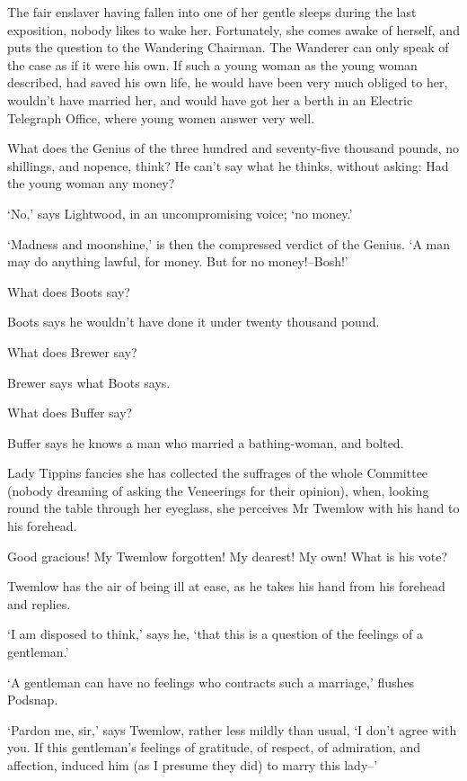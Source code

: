 The fair enslaver having fallen into one of her gentle sleeps during the
last exposition, nobody likes to wake her. Fortunately, she comes
awake of herself, and puts the question to the Wandering Chairman. The
Wanderer can only speak of the case as if it were his own. If such a
young woman as the young woman described, had saved his own life, he
would have been very much obliged to her, wouldn’t have married her, and
would have got her a berth in an Electric Telegraph Office, where young
women answer very well.

What does the Genius of the three hundred and seventy-five thousand
pounds, no shillings, and nopence, think? He can’t say what he thinks,
without asking: Had the young woman any money?

‘No,’ says Lightwood, in an uncompromising voice; ‘no money.’

‘Madness and moonshine,’ is then the compressed verdict of the Genius.
‘A man may do anything lawful, for money. But for no money!--Bosh!’

What does Boots say?

Boots says he wouldn’t have done it under twenty thousand pound.

What does Brewer say?

Brewer says what Boots says.

What does Buffer say?

Buffer says he knows a man who married a bathing-woman, and bolted.

Lady Tippins fancies she has collected the suffrages of the whole
Committee (nobody dreaming of asking the Veneerings for their opinion),
when, looking round the table through her eyeglass, she perceives Mr
Twemlow with his hand to his forehead.

Good gracious! My Twemlow forgotten! My dearest! My own! What is his
vote?

Twemlow has the air of being ill at ease, as he takes his hand from his
forehead and replies.

‘I am disposed to think,’ says he, ‘that this is a question of the
feelings of a gentleman.’

‘A gentleman can have no feelings who contracts such a marriage,’
flushes Podsnap.

‘Pardon me, sir,’ says Twemlow, rather less mildly than usual, ‘I don’t
agree with you. If this gentleman’s feelings of gratitude, of respect,
of admiration, and affection, induced him (as I presume they did) to
marry this lady--’

